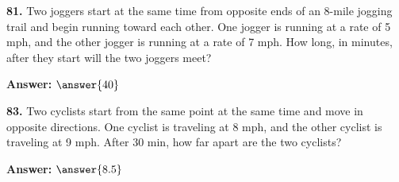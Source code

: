 \documentclass{ximera}
\begin{document}
\begin{problem}
\textbf{81.} Two joggers start at the same time from opposite ends of an 8-mile jogging trail
  and begin running toward each other. One jogger is running at a rate of 5 mph, and the
  other jogger is running at a rate of 7 mph. How long, in minutes, after they start will
  the two joggers meet?

\textbf{Answer:} $\answer{40}$
\end{problem}

\begin{problem}
\textbf{83.} Two cyclists start from the same point at the same time and move in opposite
  directions. One cyclist is traveling at 8 mph, and the other cyclist is traveling at
  9 mph. After 30 min, how far apart are the two cyclists?

\textbf{Answer:} $\answer{8.5}$
\end{problem}
\end{document}
